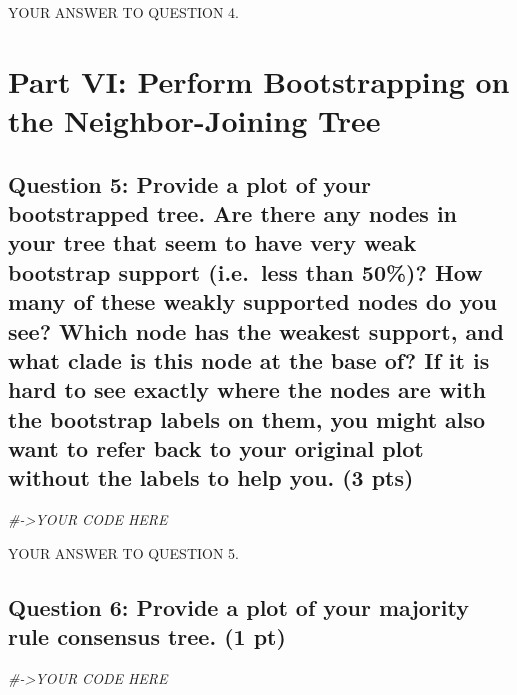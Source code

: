 \documentclass[
]{article}
\newenvironment{Shaded}{\begin{snugshade}}{\end{snugshade}}
\newcommand{\CommentTok}[1]{\textcolor[rgb]{0.56,0.35,0.01}{\textit{#1}}}
\begin{document}
YOUR ANSWER TO QUESTION 4.

\section{Part VI: Perform Bootstrapping on the Neighbor-Joining
Tree}\label{part-vi-perform-bootstrapping-on-the-neighbor-joining-tree}

\subsection{Question 5: Provide a plot of your bootstrapped tree. Are
there any nodes in your tree that seem to have very weak bootstrap
support (i.e.~less than 50\%)? How many of these weakly supported nodes
do you see? Which node has the weakest support, and what clade is this
node at the base of? If it is hard to see exactly where the nodes are
with the bootstrap labels on them, you might also want to refer back to
your original plot without the labels to help you. (3
pts)}\label{question-5-provide-a-plot-of-your-bootstrapped-tree.-are-there-any-nodes-in-your-tree-that-seem-to-have-very-weak-bootstrap-support-i.e.-less-than-50-how-many-of-these-weakly-supported-nodes-do-you-see-which-node-has-the-weakest-support-and-what-clade-is-this-node-at-the-base-of-if-it-is-hard-to-see-exactly-where-the-nodes-are-with-the-bootstrap-labels-on-them-you-might-also-want-to-refer-back-to-your-original-plot-without-the-labels-to-help-you.-3-pts}

\begin{Shaded}
\begin{Highlighting}[]
\CommentTok{\#{-}\textgreater{}YOUR CODE HERE}
\end{Highlighting}
\end{Shaded}

YOUR ANSWER TO QUESTION 5.

\subsection{Question 6: Provide a plot of your majority rule consensus
tree. (1
pt)}\label{question-6-provide-a-plot-of-your-majority-rule-consensus-tree.-1-pt}

\begin{Shaded}
\begin{Highlighting}[]
\CommentTok{\#{-}\textgreater{}YOUR CODE HERE}
\end{Highlighting}
\end{Shaded}
\end{document}
